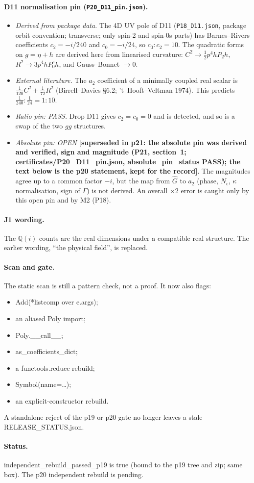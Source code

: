 \paragraph{D11 normalisation pin (\texttt{P20\_D11\_pin.json}).}
\begin{itemize}
\item \emph{Derived from package data.} The 4D UV pole of D11 (\texttt{P18\_D11.json}, package orbit convention;
  transverse; only spin-2 and spin-0s parts) has Barnes--Rivers coefficients $c_2=-i/240$ and $c_0=-i/24$, so
  $c_0:c_2=10$. The quadratic forms on $g=\eta+h$ are derived here from linearised curvature: $C^2\to\frac12
  p^4hP_2h$, $R^2\to3p^4hP_0^sh$, and Gauss--Bonnet $\to0$.
\item \emph{External literature.} The $a_2$ coefficient of a minimally coupled real scalar is
  $\frac1{120}C^2+\frac1{72}R^2$ (Birrell--Davies \S6.2; 't~Hooft--Veltman 1974). This predicts
  $\frac1{240}:\frac1{24}=1:10$.
\item \emph{Ratio pin: PASS.} Drop D11 gives $c_2=c_0=0$ and is detected, and so is a swap of the two $g g$
  structures.
\item \emph{Absolute pin: OPEN} \textbf{[superseded in p21: the absolute pin was derived and verified, sign and magnitude (P21, section~1; certificates/P20\_D11\_pin.json, absolute\_pin\_status PASS); the text below is the p20 statement, kept for the record]}. The magnitudes agree up to a common factor $-i$, but the map from $\hat G$ to $a_2$
  (phase, $N_\epsilon$, $\kappa$ normalisation, sign of $\Gamma$) is not derived. An overall $\times2$ error is caught
  only by this open pin and by M2 (P18).
\end{itemize}

\paragraph{J1 wording.} The $\mathbb Q(i)$ counts are the real dimensions under a compatible real structure. The
earlier wording, ``the physical field'', is replaced.

\paragraph{Scan and gate.} The static scan is still a pattern check, not a proof. It now also flags:
\begin{itemize}
\item Add(*listcomp over e.args);
\item an aliased Poly import;
\item Poly.\_\_call\_\_;
\item as\_coefficients\_dict;
\item a functools.reduce rebuild;
\item Symbol(name=\ldots);
\item an explicit-constructor rebuild.
\end{itemize}
A standalone reject of the p19 or p20 gate no longer leaves a stale RELEASE\_STATUS.json.

\paragraph{Status.} independent\_rebuild\_passed\_p19 is true (bound to the p19 tree and zip; same box). The p20
independent rebuild is pending.
